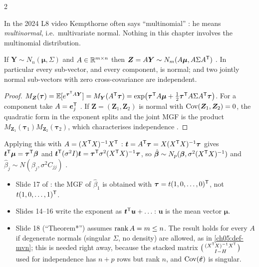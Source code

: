 \begin{paracol}{2}
\begin{coursenote}[Vocabulary]
In the 2024 L8 video Kempthorne often says ``multinomial'' : he means \emph{multinormal},
i.e.\ multivariate normal. Nothing in this chapter involves the multinomial distribution.
\end{coursenote}

\begin{proposition}\label{ch05:prop-linmap}
If $\bm Y\sim N_n(\bm\mu,\Sigma)$ and $A\in\mathbb{R}^{m\times n}$ then $\bm Z=A\bm Y\sim N_m(A\bm\mu,A\Sigma A^{\mathsf T})$ 
. In particular every sub-vector, and every component, is normal; and two jointly normal
sub-vectors with zero cross-covariance are independent.
\end{proposition}
\begin{proof}
$M_{\bm Z}(\bm\tau)=\mathbb{E}[e^{\bm\tau^{\mathsf T} A\bm Y}]=M_{\bm Y}(A^{\mathsf T}\bm\tau)=\exp\bigl(\bm\tau^{\mathsf T} A\bm\mu+\frac12\bm\tau^{\mathsf T} A\Sigma A^{\mathsf T}\bm\tau\bigr)$. For a component take
$A=\bm e_j^{\mathsf T}$ . If $\bm Z=(\bm Z_1,\bm Z_2)$ is normal with $\operatorname{Cov}(\bm Z_1,\bm Z_2)=0$, the quadratic form in the
exponent splits and the joint MGF is the product $M_{\bm Z_1}(\bm\tau_1)M_{\bm Z_2}(\bm\tau_2)$, which characterises
independence .
\end{proof}
Applying this with $A=(X^{\mathsf T} X)^{-1}X^{\mathsf T}$ : $\bm t=A^{\mathsf T}\bm\tau=X(X^{\mathsf T} X)^{-1}\bm\tau$ gives $\bm t^{\mathsf T}\bm\mu=\bm\tau^{\mathsf T}\bm\beta$ and
$\bm t^{\mathsf T}(\sigma^2I)\bm t=\bm\tau^{\mathsf T}\sigma^2(X^{\mathsf T} X)^{-1}\bm\tau$, so $\hat{\bm\beta}\sim N_p(\bm\beta,\sigma^2(X^{\mathsf T} X)^{-1})$ and
$\hat\beta_j\sim N(\beta_j,\sigma^2C_{jj})$  .

\begin{coursenote}
\begin{itemize}
  \item Slide 17 of : the MGF of $\hat\beta_1$ is obtained with $\bm\tau=t(1,0,\dots,0)^{\mathsf T}$, not $t(1,0,\dots,1)^{\mathsf T}$.
  \item Slides 14--16 write the exponent as $\bm t^{\mathsf T}\bm u+\dots$: $\bm u$ is the mean vector $\bm\mu$.
  \item Slide 18 (``Theorem*'') assumes $\operatorname{rank} A=m\le n$. The result holds for every $A$ if degenerate normals
        (singular $\Sigma$, no density) are allowed, as in \cref{ch05:def-mvn}; this is needed right away, because the
        stacked matrix $\bigl(\begin{smallmatrix}(X^{\mathsf T} X)^{-1}X^{\mathsf T}\\ I-H\end{smallmatrix}\bigr)$ used for independence has $n+p$
        rows but rank $n$, and $\operatorname{Cov}(\hat{\bm\varepsilon})$ is singular.
\end{itemize}
\end{coursenote}


\end{paracol}
